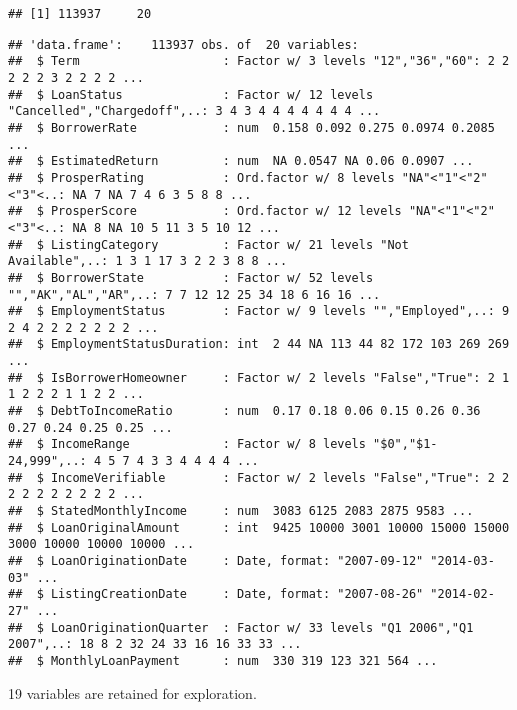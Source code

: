 \documentclass[]{article}
\begin{document}
\begin{verbatim}
## [1] 113937     20
\end{verbatim}

\begin{verbatim}
## 'data.frame':    113937 obs. of  20 variables:
##  $ Term                    : Factor w/ 3 levels "12","36","60": 2 2 2 2 2 3 2 2 2 2 ...
##  $ LoanStatus              : Factor w/ 12 levels "Cancelled","Chargedoff",..: 3 4 3 4 4 4 4 4 4 4 ...
##  $ BorrowerRate            : num  0.158 0.092 0.275 0.0974 0.2085 ...
##  $ EstimatedReturn         : num  NA 0.0547 NA 0.06 0.0907 ...
##  $ ProsperRating           : Ord.factor w/ 8 levels "NA"<"1"<"2"<"3"<..: NA 7 NA 7 4 6 3 5 8 8 ...
##  $ ProsperScore            : Ord.factor w/ 12 levels "NA"<"1"<"2"<"3"<..: NA 8 NA 10 5 11 3 5 10 12 ...
##  $ ListingCategory         : Factor w/ 21 levels "Not Available",..: 1 3 1 17 3 2 2 3 8 8 ...
##  $ BorrowerState           : Factor w/ 52 levels "","AK","AL","AR",..: 7 7 12 12 25 34 18 6 16 16 ...
##  $ EmploymentStatus        : Factor w/ 9 levels "","Employed",..: 9 2 4 2 2 2 2 2 2 2 ...
##  $ EmploymentStatusDuration: int  2 44 NA 113 44 82 172 103 269 269 ...
##  $ IsBorrowerHomeowner     : Factor w/ 2 levels "False","True": 2 1 1 2 2 2 1 1 2 2 ...
##  $ DebtToIncomeRatio       : num  0.17 0.18 0.06 0.15 0.26 0.36 0.27 0.24 0.25 0.25 ...
##  $ IncomeRange             : Factor w/ 8 levels "$0","$1-24,999",..: 4 5 7 4 3 3 4 4 4 4 ...
##  $ IncomeVerifiable        : Factor w/ 2 levels "False","True": 2 2 2 2 2 2 2 2 2 2 ...
##  $ StatedMonthlyIncome     : num  3083 6125 2083 2875 9583 ...
##  $ LoanOriginalAmount      : int  9425 10000 3001 10000 15000 15000 3000 10000 10000 10000 ...
##  $ LoanOriginationDate     : Date, format: "2007-09-12" "2014-03-03" ...
##  $ ListingCreationDate     : Date, format: "2007-08-26" "2014-02-27" ...
##  $ LoanOriginationQuarter  : Factor w/ 33 levels "Q1 2006","Q1 2007",..: 18 8 2 32 24 33 16 16 33 33 ...
##  $ MonthlyLoanPayment      : num  330 319 123 321 564 ...
\end{verbatim}

19 variables are retained for exploration.
\end{document}
